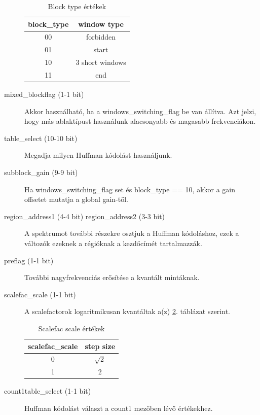 \documentclass[12pt, a4paper]{article}
\begin{document}
\begin{description}
  \begin{table}[h]
  \centering
  \footnotesize
  \begin{tabular}{|c|c|}
    \hline
    \textbf{block\_type} & \textbf{window type} \\
    \hline
    00 & forbidden \\
    \hline
    01 & start \\
    \hline
    10 & 3 short windows \\
    \hline
    11 & end \\
    \hline
  \end{tabular}
  \caption{Block type értékek}
  \label{tab:block-type}
  \end{table}

  \item [mixed\_blockflag (1-1 bit)] Akkor használható, ha  a windows\_switching\_flag be van állítva. Azt jelzi, hogy más ablaktípust használunk alacsonyabb és magasabb frekvenciákon.
  \item [table\_select (10-10 bit)] Megadja milyen Huffman kódolást használjunk.
  \item [subblock\_gain (9-9 bit)] Ha windows\_switching\_flag set és block\_type == 10, akkor a gain offsetet mutatja a global gain-től.
  \item [region\_address1 (4-4 bit) region\_address2 (3-3 bit)] A spektrumot további részekre osztjuk a Huffman kódoláshoz, ezek a változók ezeknek a régióknak a kezdőcímét tartalmazzák.
  \item [preflag (1-1 bit)] További nagyfrekvenciás erősítése a kvantált mintáknak.
  \item [scalefac\_scale (1-1 bit)] A scalefactorok logaritmikusan kvantáltak a(z) \ref{tab:scalefac-scale}. táblázat szerint.
  
  \begin{table}[h]
  \centering
  \footnotesize
  \begin{tabular}{|c|c|}
    \hline
    \textbf{scalefac\_scale} & \textbf{step size} \\
    \hline
    0 & $\sqrt{2}$ \\
    \hline
    1 & 2 \\
    \hline
  \end{tabular}
  \caption{Scalefac scale értékek}
  \label{tab:scalefac-scale}
  \end{table}

  \item [count1table\_select (1-1 bit)] Huffman kódolást választ a count1 mezőben lévő értékekhez.
\end{description}
\end{document}
